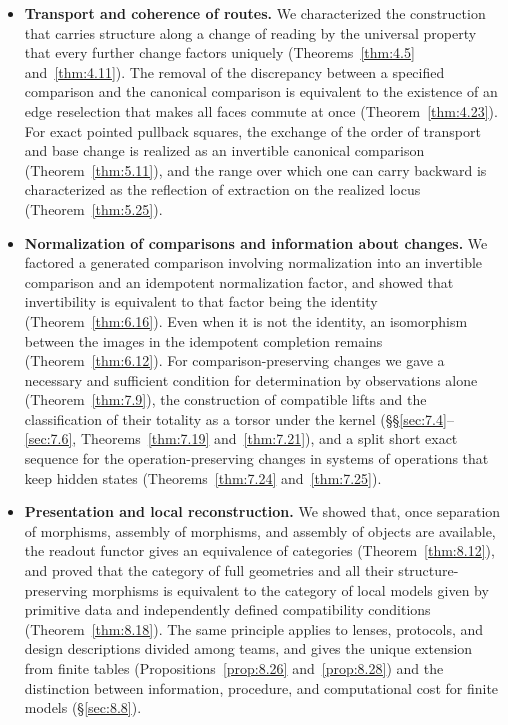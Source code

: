 \begin{itemize}
to four charts built from the same Atom input, we constructed the comparison square and
showed that the verdicts, zero or nonzero, agree
(Theorems~\ref{thm:3.43} and~\ref{thm:3.44}).
\item \textbf{Transport and coherence of routes.} We characterized the construction that
carries structure along a change of reading by the universal property that every further
change factors uniquely (Theorems~\ref{thm:4.5} and~\ref{thm:4.11}). The removal of the
discrepancy between a specified comparison and the canonical comparison is equivalent to the
existence of an edge reselection that makes all faces commute at once
(Theorem~\ref{thm:4.23}). For exact pointed pullback squares, the exchange of the order
of transport and base change is realized as an invertible canonical comparison
(Theorem~\ref{thm:5.11}), and the range over which one can carry backward is characterized
as the reflection of extraction on the realized locus (Theorem~\ref{thm:5.25}).
\item \textbf{Normalization of comparisons and information about changes.} We factored a
generated comparison involving normalization into an invertible comparison and an idempotent
normalization factor, and showed that invertibility is equivalent to that factor being the
identity (Theorem~\ref{thm:6.16}). Even when it is not the identity, an isomorphism between
the images in the idempotent completion remains (Theorem~\ref{thm:6.12}). For
comparison-preserving changes we gave a necessary and sufficient condition for determination
by observations alone (Theorem~\ref{thm:7.9}), the construction of compatible lifts and the
classification of their totality as a torsor under the kernel
(\S\S\ref{sec:7.4}--\ref{sec:7.6}, Theorems~\ref{thm:7.19} and~\ref{thm:7.21}), and a split
short exact sequence for the operation-preserving changes in systems of operations that keep
hidden states (Theorems~\ref{thm:7.24} and~\ref{thm:7.25}).
\item \textbf{Presentation and local reconstruction.} We showed that, once separation of
morphisms, assembly of morphisms, and assembly of objects are available, the readout functor
gives an equivalence of categories (Theorem~\ref{thm:8.12}), and proved that the category of
full geometries and all their structure-preserving morphisms is equivalent to the category
of local models given by primitive data and independently defined compatibility conditions
(Theorem~\ref{thm:8.18}). The same principle applies to lenses, protocols, and design
descriptions divided among teams, and gives the unique extension from finite tables
(Propositions~\ref{prop:8.26} and~\ref{prop:8.28}) and the distinction between information,
procedure, and computational cost for finite models (\S\ref{sec:8.8}).
\end{itemize}

